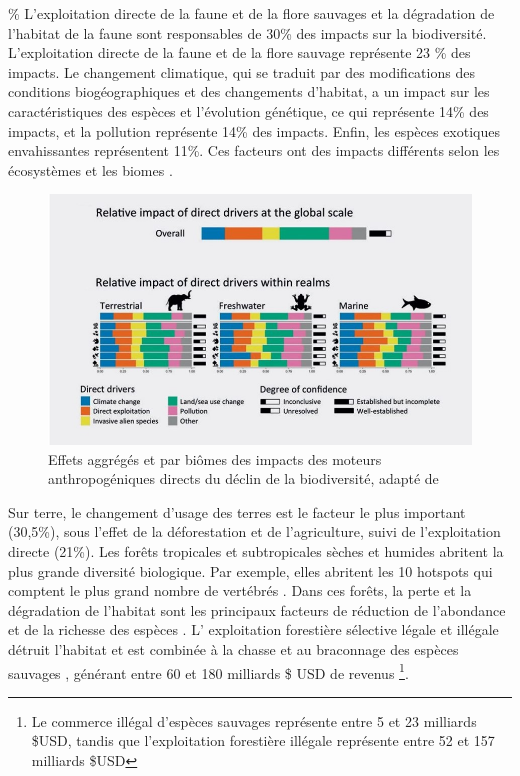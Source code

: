 \%
L'exploitation directe de la faune et de la flore sauvages et la dégradation de l'habitat de la faune sont responsables de 30\% des impacts sur la biodiversité. L'exploitation directe de la faune et de la flore sauvage représente 23 \% des impacts. Le changement climatique, qui se traduit par des modifications des conditions biogéographiques et des changements d'habitat, a un impact sur les caractéristiques des espèces et l'évolution génétique, ce qui représente 14\% des impacts, et la pollution représente 14\% des impacts. Enfin, les espèces exotiques envahissantes représentent 11\%. Ces facteurs ont des impacts différents selon les écosystèmes et les biomes \citep{ipbes_2022_6417333}. 

\begin{figure}[h]
	\centering
	\includegraphics[width = .95 \textwidth]{figures/intro/intro_impactsfin.jpg}
	\caption{Effets aggrégés et par biômes des impacts des moteurs anthropogéniques directs du déclin de la biodiversité, adapté de  \cite{ipbes_2022_6417333}}
	\label{fig:intro_impacts_french}
\end{figure}

Sur terre, le changement d'usage des terres est le facteur le plus important (30,5\%), sous l'effet de la déforestation et de l'agriculture, suivi de l'exploitation directe (21\%).  Les forêts tropicales et subtropicales sèches et humides abritent la plus grande diversité biologique. Par exemple, elles abritent les 10 hotspots qui comptent le plus grand nombre de vertébrés \citep{mittermeier_global_2011}. Dans ces forêts, la perte et la dégradation de l'habitat sont les principaux facteurs de réduction de l'abondance et de la richesse des espèces \citep{newbold_global_2014}. L' exploitation forestière sélective légale et illégale détruit l'habitat \citep{hoare2022establishing, bousfield_2023_large} et est combinée à la chasse et au braconnage des espèces sauvages \citep{gallego_2020_combined}, générant entre 60 et 180 milliards \$ USD de revenus \citep{gfi_2017}\footnote{Le commerce illégal d'espèces sauvages représente entre 5 et 23 milliards \$USD, tandis que l'exploitation forestière illégale représente entre 52 et 157 milliards \$USD}. 

